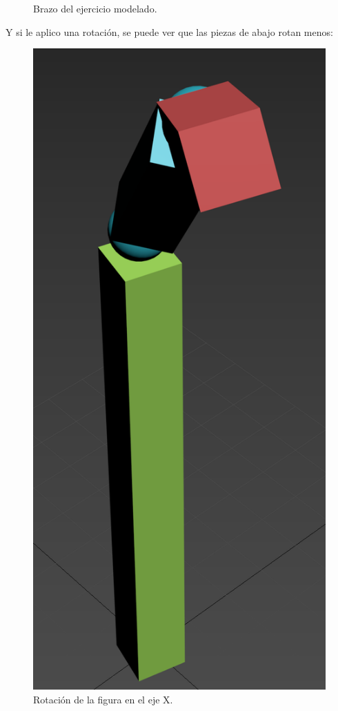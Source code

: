 \documentclass{article}
\begin{document}
\begin{figure}[H]
   \caption{Brazo del ejercicio modelado.}
\end{figure}

Y si le aplico una rotación, se puede ver que las piezas de abajo rotan menos:

\begin{figure}[H]
   \centering
   \includegraphics[width=\textwidth]{imagenes/brazo2mio.png}
   \caption{Rotación de la figura en el eje X.}
\end{figure}
\end{document}
